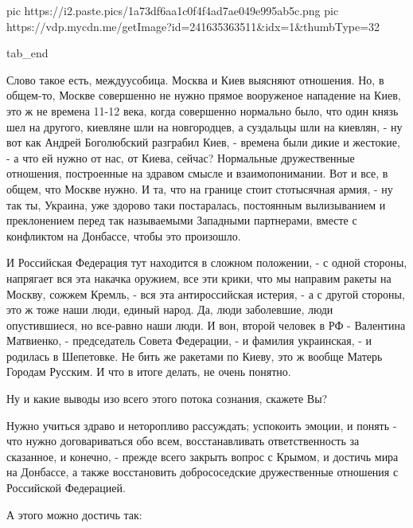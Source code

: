      pic https://i2.paste.pics/1a73df6aa1c0f4f4ad7ae049e995ab5c.png
		 pic https://vdp.mycdn.me/getImage?id=241635363511&idx=1&thumbType=32

  tab_end
\fi

Слово такое есть, междуусобица.  Москва и Киев выясняют
отношения. Но, в общем-то, Москве совершенно не нужно прямое вооруженое
нападение на Киев, это ж не времена 11-12 века, когда совершенно нормально
было, что один князь шел на другого, киевляне шли на новгородцев, а суздальцы
шли на киевлян, - ну вот как Андрей Боголюбский разграбил Киев, - времена были
дикие и жестокие, - а что ей нужно от нас, от Киева, сейчас?  Нормальные
дружественные отношения, построенные на здравом смысле и взаимопонимании. Вот и
все, в общем, что Москве нужно. И та, что на границе стоит стотысячная армия, -
ну так ты, Украина, уже здорово таки постаралась, постоянным вылизыванием и
преклонением перед так называемыми Западными партнерами, вместе с конфликтом на
Донбассе, чтобы это произошло. 

И Российская Федерация тут находится в сложном положении, - с одной стороны,
напрягает вся эта накачка оружием, все эти крики, что мы направим ракеты на
Москву, сожжем Кремль, - вся эта антироссийская истерия, - а с другой стороны,
это ж тоже наши люди, единый народ. Да, люди заболевшие, люди опустившиеся, но
все-равно наши люди.  И вон, второй человек в РФ - Валентина Матвиенко, -
председатель Совета Федерации, - и фамилия украинская, - и родилась в
Шепетовке. Не бить же ракетами по Киеву, это ж вообще Матерь Городам Русским. И
что в итоге делать, не очень понятно.

Ну и какие выводы изо всего этого потока сознания, скажете Вы? 

Нужно учиться здраво и неторопливо рассуждать; успокоить эмоции, и понять - что
нужно договариваться обо всем, восстанавливать ответственность за сказанное, и
конечно, - прежде всего закрыть вопрос с Крымом, и достичь мира на Донбассе, а
также восстановить добрососедские дружественные отношения с Российской
Федерацией.

А этого можно достичь так:

